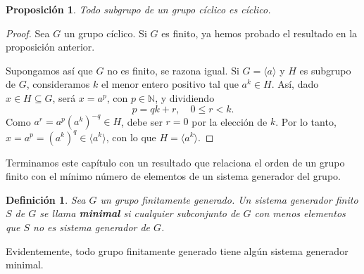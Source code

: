 \documentclass[12pt]{article}
\newtheorem{proposition}[theorem]{Proposición}
\newtheorem{definition}[theorem]{Definición}
\begin{document}
\begin{proposition}Todo subgrupo de un grupo cíclico es cíclico.
\end{proposition}
\begin{proof}
Sea $G$ un grupo cíclico. Si $G$ es finito, ya hemos probado el resultado en la proposición anterior.

Supongamos así que $G$ no es finito, se razona igual. Si $G = \langle a \rangle$ y $H$ es subgrupo de $G$, consideramos $k$ el menor entero positivo tal que $a^k \in H$. Así, dado $x \in H \subseteq G$, será $x = a^p$, con $p \in \mathbb{N}$, y dividiendo $$p = qk + r, \quad 0 \leq r <k.$$ Como $a^r = a^p(a^k)^{-q} \in H$, debe ser $r = 0$ por la elección de $k$. Por lo tanto, $x = a^p = (a^k)^q \in \langle a^k \rangle$, con lo que $H = \langle a^k \rangle$.

\end{proof}

Terminamos este capítulo con un resultado que relaciona el orden de un grupo finito con el mínimo número de elementos de un sistema generador del grupo.

\begin{definition} Sea $G$ un grupo finitamente generado. Un sistema generador finito $S$ de $G$ se llama \textbf{minimal} si cualquier subconjunto de $G$ con menos elementos que $S$ no es sistema generador de $G$.
\end{definition}

Evidentemente, todo grupo finitamente generado tiene algún sistema generador minimal.
\end{document}
